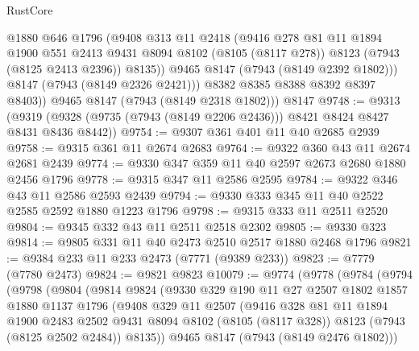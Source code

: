 \begin{lexlean}{RustCore}
\begin{coremodule}
              @1880
              @646
              @1796
              (@9408
                @313
                @11
                @2418
                (@9416
                  @278
                  @81
                  @11
                  @1894
                  @1900
                  @551
                  @2413
                  @9431
                  @8094
                  @8102
                  (@8105 (@8117 @278))
                  @8123
                  (@7943 (@8125 @2413 @2396))
                  @8135))
              @9465
              @8147
              (@7943 (@8149 @2392 @1802)))
            @8147
            (@7943 (@8149 @2326 @2421)))
          @8382
          @8385
          @8388
          @8392
          @8397
          @8403))
      @9465
      @8147
      (@7943 (@8149 @2318 @1802)))
    @8147
@9748 := @9313
    (@9319 (@9328 (@9735 (@7943 (@8149 @2206 @2436))) @8421 @8424 @8427 @8431 @8436 @8442))
@9754 := @9307 @361 @401 @11 @40 @2685 @2939
@9758 := @9315 @361 @11 @2674 @2683
@9764 := @9322 @360 @43 @11 @2674 @2681 @2439
@9774 := @9330 @347 @359 @11 @40 @2597 @2673 @2680 @1880 @2456 @1796
@9778 := @9315 @347 @11 @2586 @2595
@9784 := @9322 @346 @43 @11 @2586 @2593 @2439
@9794 := @9330 @333 @345 @11 @40 @2522 @2585 @2592 @1880 @1223 @1796
@9798 := @9315 @333 @11 @2511 @2520
@9804 := @9345 @332 @43 @11 @2511 @2518 @2302
@9805 := @9330 @323
@9814 := @9805 @331 @11 @40 @2473 @2510 @2517 @1880 @2468 @1796
@9821 := @9384 @233 @11 @233 @2473 (@7771 (@9389 @233))
@9823 := @7779 (@7780 @2473)
@9824 := @9821 @9823
@10079 := @9774
    (@9778
      (@9784
        (@9794
          (@9798
            (@9804
              (@9814
                @9824
                (@9330
                  @329
                  @190
                  @11
                  @27
                  @2507
                  @1802
                  @1857
                  @1880
                  @1137
                  @1796
                  (@9408
                    @329
                    @11
                    @2507
                    (@9416
                      @328
                      @81
                      @11
                      @1894
                      @1900
                      @2483
                      @2502
                      @9431
                      @8094
                      @8102
                      (@8105 (@8117 @328))
                      @8123
                      (@7943 (@8125 @2502 @2484))
                      @8135))
                  @9465
                  @8147
                  (@7943 (@8149 @2476 @1802)))

\end{coremodule}
\end{lexlean}
